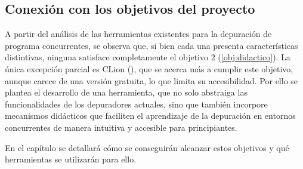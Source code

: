 
\subsection{Conexión con los objetivos del proyecto}{\label{subsec:conexión-objetivos-proyecto}}

A partir del análisis de las herramientas existentes para la depuración de \glspl{programa concurrente}, se observa que, si bien cada una presenta características distintivas, ninguna satisface completamente el objetivo 2 (\ref{obj:didactico}). La única excepción parcial es CLion (), que se acerca más a cumplir este objetivo, aunque carece de una versión gratuita, lo que limita su accesibilidad. Por ello se plantea el desarrollo de una herramienta, que no solo abstraiga las funcionalidades de los depuradores actuales, sino que también incorpore mecanismos didácticos que faciliten el aprendizaje de la depuración en entornos concurrentes de manera intuitiva y accesible para principiantes.

En el capítulo  se detallará cómo se conseguirán alcanzar estos objetivos y qué herramientas se utilizarán para ello.


